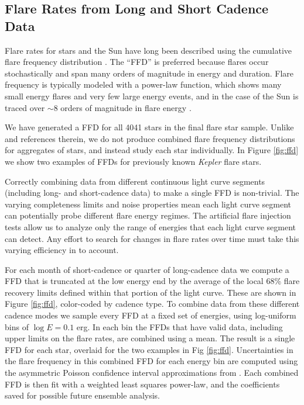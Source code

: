 \documentclass[twocolumn]{aastex6}
\newcommand{\Kepler}{\textsl{Kepler}\xspace}
\begin{document}
\subsection{Flare Rates from Long and Short Cadence Data}

Flare rates for stars and the Sun have long been described using the cumulative flare frequency distribution \citep[e.g.][]{lme1976}. The ``FFD'' is preferred because flares occur stochastically and span many orders of magnitude in energy and duration. Flare frequency is typically modeled with a power-law function, which shows many small energy flares and very few large energy events, and in the case of the Sun is traced over $\sim$8 orders of magnitude in flare energy \citep{maehara2015}.

We have generated a FFD for all 4041 stars in the final flare star sample. Unlike \citet{maehara2015} and references therein, we do not produce combined flare frequency distributions for aggregates of stars, and instead study each star individually. In Figure \ref{fig:ffd} we show two examples of FFDs for previously known \Kepler flare stars.

Correctly combining data from different continuous light curve segments (including long- and short-cadence data) to make a single FFD is non-trivial. The varying completeness limits and noise properties mean each light curve segment can potentially probe different flare energy regimes. The artificial flare injection tests allow us to analyze only the range of energies that each light curve segment can detect.
Any effort to search for changes in flare rates over time must take this varying efficiency in to account.

For each month of short-cadence or quarter of long-cadence data we compute a FFD that is truncated at the low energy end by the average of the local 68\% flare recovery limits defined within that portion of the light curve. These are shown in Figure \ref{fig:ffd}, color-coded by cadence type. To combine data from these different cadence modes we sample every FFD at a fixed set of energies, using log-uniform bins of $\log E = 0.1$ erg. In each bin the FFDs that have valid data, including upper limits on the flare rates, are combined using a mean. The result is a single FFD for each star, overlaid for the two examples in Fig \ref{fig:ffd}. Uncertainties in the flare frequency in this combined FFD for each energy bin are computed using the asymmetric Poisson confidence interval approximations from \citet{gehrels1986}. Each combined FFD is then fit with a weighted least squares power-law, and the coefficients saved for possible future ensemble analysis.
\end{document}
